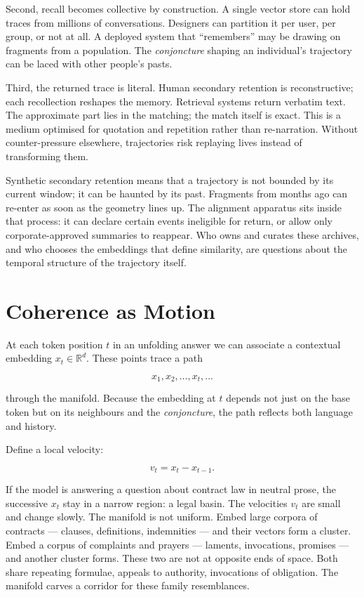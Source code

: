\documentclass[12pt,a4paper]{article}
\begin{document}
Second, recall becomes collective by construction. A single vector store can hold traces from millions of conversations. Designers can partition it per user, per group, or not at all. A deployed system that ``remembers'' may be drawing on fragments from a population. The \emph{conjoncture} shaping an individual's trajectory can be laced with other people's pasts.

Third, the returned trace is literal. Human secondary retention is reconstructive; each recollection reshapes the memory. Retrieval systems return verbatim text. The approximate part lies in the matching; the match itself is exact. This is a medium optimised for quotation and repetition rather than re-narration. Without counter-pressure elsewhere, trajectories risk replaying lives instead of transforming them.

Synthetic secondary retention means that a trajectory is not bounded by its current window; it can be haunted by its past. Fragments from months ago can re-enter as soon as the geometry lines up. The alignment apparatus sits inside that process: it can declare certain events ineligible for return, or allow only corporate-approved summaries to reappear. Who owns and curates these archives, and who chooses the embeddings that define similarity, are questions about the temporal structure of the trajectory itself.

\section{Coherence as Motion}

At each token position $t$ in an unfolding answer we can associate a contextual embedding $x_t \in \mathbb{R}^d$. These points trace a path

\[
x_1, x_2, \dots, x_t, \dots
\]

through the manifold. Because the embedding at $t$ depends not just on the base token but on its neighbours and the \emph{conjoncture}, the path reflects both language and history.

Define a local velocity:

\[
v_t = x_t - x_{t-1}.
\]

If the model is answering a question about contract law in neutral prose, the successive $x_t$ stay in a narrow region: a legal basin. The velocities $v_t$ are small and change slowly. The manifold is not uniform. Embed large corpora of contracts --- clauses, definitions, indemnities --- and their vectors form a cluster. Embed a corpus of complaints and prayers --- laments, invocations, promises --- and another cluster forms. These two are not at opposite ends of space. Both share repeating formulae, appeals to authority, invocations of obligation. The manifold carves a corridor for these family resemblances.
\end{document}
